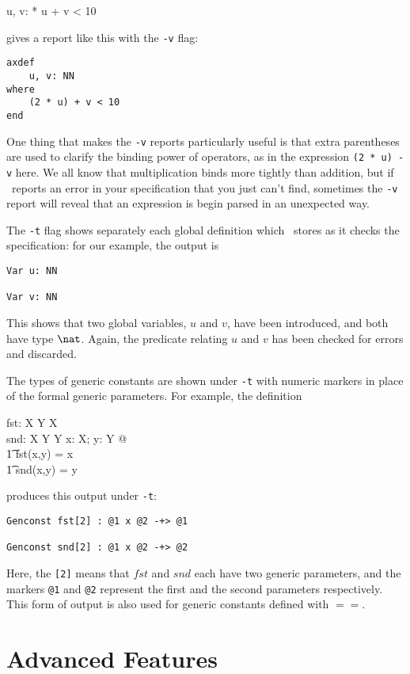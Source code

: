 \begin{axdef}
        u, v: \nat
{} * u + v < 10
\end{axdef}
gives a report like this with the \verb/-v/ flag:
\begin{verbatim}
axdef
    u, v: NN
where
    (2 * u) + v < 10
end
\end{verbatim}
One thing that makes the \verb/-v/ reports particularly useful is
that extra parentheses are used to clarify the binding power of
operators, as in the expression \verb/(2 * u) - v/ here.  We all
know that multiplication binds more tightly than addition, but if
\fuzz\ reports an error in your specification that you 
just can't find, sometimes the \verb/-v/ report will reveal that an
expression is begin parsed in an unexpected way.

The \verb/-t/ flag shows separately each global definition which
\fuzz\ stores as it checks the specification: for our example, the
output is
\begin{verbatim}
Var u: NN

Var v: NN
\end{verbatim}
This shows that two global variables, $u$ and $v$, have been
introduced, and both have type $\nat$. Again, the predicate relating
$u$ and $v$ has been checked for errors and discarded.

The types of generic constants are shown under \verb/-t/ with
numeric markers in place of the formal generic parameters.  For
example, the definition
\begin{gendef}[X, Y]
        fst: X \cross Y \fun X \\
        snd: X \cross Y \fun Y
\where
        \forall x: X; y: Y @ \\
\t1             fst(x,y) = x \land \\
\t1             snd(x,y) = y
\end{gendef}
produces this output under \verb/-t/:
\begin{verbatim}
Genconst fst[2] : @1 x @2 -+> @1

Genconst snd[2] : @1 x @2 -+> @2
\end{verbatim}
Here, the \verb/[2]/ means that $fst$ and $snd$ each have two generic
parameters, and the markers \verb/@1/ and \verb/@2/ represent the
first and the second parameters respectively.  This form of output
is also used for generic constants defined with
$==$.

\chapter{Advanced Features}\label{advanced}

